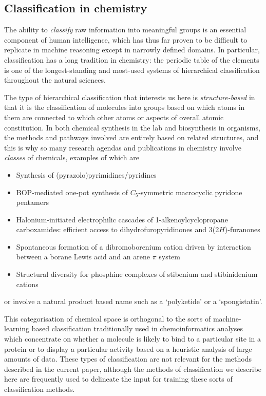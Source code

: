 \documentclass[10pt]{bmc_article}
\newenvironment{bmcformat}{\baselineskip20pt\sloppy\setboolean{publ}{false}}{\baselineskip20pt\sloppy}
\begin{document}
\begin{bmcformat}
\subsection*{Classification in chemistry}
\label{sec:backclassif}

The ability to \textit{classify} raw information into meaningful groups is an essential component of human intelligence, which has thus far proven to be difficult to replicate in machine reasoning except in narrowly defined domains.  In particular, classification has a long tradition in chemistry:  the periodic table of the elements is one of the longest-standing and most-used systems of hierarchical classification throughout the natural sciences.  

The type of hierarchical classification that interests us here is \textit{structure-based} in that it is the classification of molecules into groups based on which atoms in them are connected to which other atoms or aspects of overall atomic constitution.  In both chemical synthesis in the lab and biosynthesis in organisms, the methods and pathways involved are entirely based on related structures, and this is why so many research agendas and publications in chemistry involve \textit{classes} of chemicals, examples of which are 
\begin{itemize}
\item Synthesis of (pyrazolo)pyrimidines/pyridines
\item BOP-mediated one-pot synthesis of $C_5$-symmetric macrocyclic pyridone pentamers
\item Halonium-initiated electrophilic cascades of 1-alkenoylcyclopropane carboxamides: efficient access to dihydrofuropyridinones and 3(2$H$)-furanones
\item Spontaneous formation of a dibromoborenium cation driven by interaction between a borane Lewis acid and an arene $\pi$ system
\item Structural diversity for phosphine complexes of stibenium and stibinidenium cations
\end{itemize}
or involve a natural product based name such as a `polyketide' or a `spongistatin'.  

This categorisation of chemical space is orthogonal to the sorts of machine-learning based classification traditionally used in chemoinformatics analyses which concentrate on whether a molecule is likely to bind to a particular site in a protein or to display a particular activity based on a heuristic analysis of large amounts of data. These types of classification are not relevant for the methods described in the current paper, although the methods of classification we describe here are frequently used to delineate the input for training these sorts of classification methods.  


\end{bmcformat}
\end{document}
